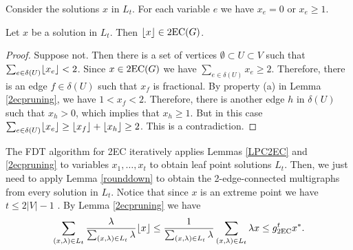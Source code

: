 Consider the solutions $x$ in $L_t$. For each variable $e$ we have $x_e=0$ or $x_e\geq 1$. 
\begin{lemma}\label{rounddown}
	Let $x$ be a solution in $L_t$. Then $\lfloor x\rfloor \in \operatorname{2EC}(G)$. 
\end{lemma}
\begin{proof}
	Suppose not. Then there is a set of vertices $\emptyset \subset U \subset V$ such that $\sum_{e\in \delta(U)}\lfloor x_e\rfloor<2$. Since $x\in \operatorname{2EC}(G)$ we have $\sum_{e\in \delta(U)}x_e \geq 2$. Therefore, there is an edge $f\in \delta(U)$ such that $x_f$ is fractional. By property (a) in Lemma \ref{2ecpruning}, we have $1<  x_f < 2$. Therefore, there is another edge $h$ in $\delta(U)$ such that $x_h>0$, which implies that $x_h\geq 1$. But in this case $\sum_{e\in \delta(U)}\lfloor x_e\rfloor\geq  \lfloor x_f\rfloor+\lfloor x_h\rfloor  \geq 2$. This is a contradiction.
\end{proof}

The FDT algorithm for 2EC iteratively applies Lemmas \ref{LPC2EC} and \ref{2ecpruning} to variables $x_1,\ldots,x_t$ to obtain leaf point solutions $L_t$. Then, we just need to apply Lemma \ref{rounddown} to obtain the 2-edge-connected multigraphs from every solution in $L_t$. Notice that since $x$ is an extreme point we have $t\leq 2|V|-1$ \cite{gerard}. By Lemma \ref{2ecpruning} we have
\begin{align*}
	\sum_{(x,\lambda)\in L_t} \frac{\lambda}{\sum_{(x,\lambda)\in L_t}\lambda} \lfloor x\rfloor \leq \frac{1}{\sum_{(x,\lambda)\in L_t}\lambda} \sum_{(x,\lambda)\in L_t} \lambda {x} \leq g^t_{\operatorname{2EC}} x^*.
\end{align*}
